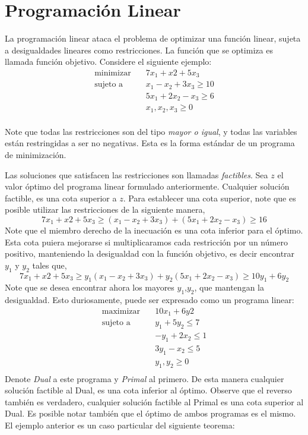 \documentclass[../np-approximations.tex]{subfiles}
\begin{document}
\section{Programación Linear}

La programación linear ataca el problema de optimizar una función 
linear, sujeta a desigualdades lineares como restricciones. La 
función que se optimiza es llamada función objetivo. Considere el 
siguiente ejemplo:
\begin{align*}
	\text{minimizar}\quad & 7x_1 + x2 + 5x_3        \\
	\text{sujeto a}\quad  & x_1 - x_2 + 3x_3 \ge 10 \\
	                      & 5x_1 + 2x_2 - x_3 \ge 6 \\
	                      & x_1, x_2, x_3 \ge 0     \\
\end{align*}

Note que todas las restricciones son del tipo \emph{mayor o igual}, 
y todas las variables están restringidas a ser no negativas. Esta 
es la forma estándar de un programa de minimización.

Las soluciones que satisfacen las restricciones son llamadas
\emph{factibles}. Sea $z$ el valor óptimo del programa linear 
formulado anteriormente. Cualquier solución factible, es una cota 
superior a $z$. Para establecer una cota superior, note que es 
posible utilizar las restricciones de la siguiente manera,
$$7x_1 + x2 + 5x_3 \ge
(x_1 - x_2 + 3x_3) + (5x_1 + 2x_2 - x_3) \ge 16$$
Note que el miembro derecho de la inecuación es una cota inferior 
para el óptimo. Esta cota puiera mejorarse si multiplicaramos cada 
restricción por un número positivo, manteniendo la desigualdad con 
la función objetivo, es decir encontrar $y_1$ y $y_2$ tales que,
$$7x_1 + x2 + 5x_3 \ge
y_1(x_1 - x_2 + 3x_3) + y_2(5x_1 + 2x_2 - x_3) \ge 10y_1 + 6y_2$$
Note que se desea encontrar ahora los mayores $y_1$,$y_2$, que 
mantengan la desigualdad. Esto duriosamente, puede ser expresado 
como un programa linear:
\begin{align*}
	\text{maximizar}\quad & 10x_1 + 6y2       \\
	\text{sujeto a}\quad  & y_1 + 5y_2  \le 7 \\
	                      & -y_1 + 2x_2 \le 1 \\
	                      & 3y_1 - x_2  \le 5 \\
	                      & y_1, y_2    \ge 0 \\
\end{align*}
Denote \emph{Dual} a este programa y \emph{Primal} al primero. De 
esta manera cualquier solución factible al Dual, es una cota 
inferior al óptimo. Observe que el reverso también es verdadero, 
cualquier solución factible al Primal es una cota superior al Dual.
Es posible notar también que el óptimo de ambos programas es el 
mismo. El ejemplo anterior es un caso particular del siguiente teorema:
\end{document}
